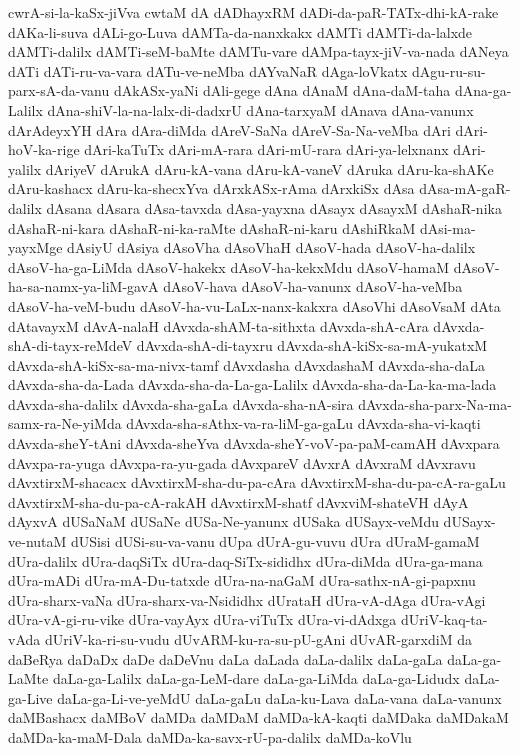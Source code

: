 {cwrA-si-la-kaSx-jiVva
cwtaM
dA
dADhayxRM
dADi-da-paR-TATx-dhi-kA-rake
dAKa-li-suva
dALi-go-Luva
dAMTa-da-nanxkakx
dAMTi
dAMTi-da-lalxde
dAMTi-dalilx
dAMTi-seM-baMte
dAMTu-vare
dAMpa-tayx-jiV-va-nada
dANeya
dATi
dATi-ru-va-vara
dATu-ve-neMba
dAYvaNaR
dAga-loVkatx
dAgu-ru-su-parx-sA-da-vanu
dAkASx-yaNi
dAli-gege
dAna
dAnaM
dAna-daM-taha
dAna-ga-Lalilx
dAna-shiV-la-na-lalx-di-dadxrU
dAna-tarxyaM
dAnava
dAna-vanunx
dArAdeyxYH
dAra
dAra-diMda
dAreV-SaNa
dAreV-Sa-Na-veMba
dAri
dAri-hoV-ka-rige
dAri-kaTuTx
dAri-mA-rara
dAri-mU-rara
dAri-ya-lelxnanx
dAri-yalilx
dAriyeV
dArukA
dAru-kA-vana
dAru-kA-vaneV
dAruka
dAru-ka-shAKe
dAru-kashacx
dAru-ka-shecxYva
dArxkASx-rAma
dArxkiSx
dAsa
dAsa-mA-gaR-dalilx
dAsana
dAsara
dAsa-tavxda
dAsa-yayxna
dAsayx
dAsayxM
dAshaR-nika
dAshaR-ni-kara
dAshaR-ni-ka-raMte
dAshaR-ni-karu
dAshiRkaM
dAsi-ma-yayxMge
dAsiyU
dAsiya
dAsoVha
dAsoVhaH
dAsoV-hada
dAsoV-ha-dalilx
dAsoV-ha-ga-LiMda
dAsoV-hakekx
dAsoV-ha-kekxMdu
dAsoV-hamaM
dAsoV-ha-sa-namx-ya-liM-gavA
dAsoV-hava
dAsoV-ha-vanunx
dAsoV-ha-veMba
dAsoV-ha-veM-budu
dAsoV-ha-vu-LaLx-nanx-kakxra
dAsoVhi
dAsoVsaM
dAta
dAtavayxM
dAvA-nalaH
dAvxda-shAM-ta-sithxta
dAvxda-shA-cAra
dAvxda-shA-di-tayx-reMdeV
dAvxda-shA-di-tayxru
dAvxda-shA-kiSx-sa-mA-yukatxM
dAvxda-shA-kiSx-sa-ma-nivx-tamf
dAvxdasha
dAvxdashaM
dAvxda-sha-daLa
dAvxda-sha-da-Lada
dAvxda-sha-da-La-ga-Lalilx
dAvxda-sha-da-La-ka-ma-lada
dAvxda-sha-dalilx
dAvxda-sha-gaLa
dAvxda-sha-nA-sira
dAvxda-sha-parx-Na-ma-samx-ra-Ne-yiMda
dAvxda-sha-sAthx-va-ra-liM-ga-gaLu
dAvxda-sha-vi-kaqti
dAvxda-sheY-tAni
dAvxda-sheYva
dAvxda-sheY-voV-pa-paM-camAH
dAvxpara
dAvxpa-ra-yuga
dAvxpa-ra-yu-gada
dAvxpareV
dAvxrA
dAvxraM
dAvxravu
dAvxtirxM-shacacx
dAvxtirxM-sha-du-pa-cAra
dAvxtirxM-sha-du-pa-cA-ra-gaLu
dAvxtirxM-sha-du-pa-cA-rakAH
dAvxtirxM-shatf
dAvxviM-shateVH
dAyA
dAyxvA
dUSaNaM
dUSaNe
dUSa-Ne-yanunx
dUSaka
dUSayx-veMdu
dUSayx-ve-nutaM
dUSisi
dUSi-su-va-vanu
dUpa
dUrA-gu-vuvu
dUra
dUraM-gamaM
dUra-dalilx
dUra-daqSiTx
dUra-daq-SiTx-sididhx
dUra-diMda
dUra-ga-mana
dUra-mADi
dUra-mA-Du-tatxde
dUra-na-naGaM
dUra-sathx-nA-gi-papxnu
dUra-sharx-vaNa
dUra-sharx-va-Nsididhx
dUrataH
dUra-vA-dAga
dUra-vAgi
dUra-vA-gi-ru-vike
dUra-vayAyx
dUra-viTuTx
dUra-vi-dAdxga
dUriV-kaq-ta-vAda
dUriV-ka-ri-su-vudu
dUvARM-ku-ra-su-pU-gAni
dUvAR-garxdiM
da
daBeRya
daDaDx
daDe
daDeVnu
daLa
daLada
daLa-dalilx
daLa-gaLa
daLa-ga-LaMte
daLa-ga-Lalilx
daLa-ga-LeM-dare
daLa-ga-LiMda
daLa-ga-Lidudx
daLa-ga-Live
daLa-ga-Li-ve-yeMdU
daLa-gaLu
daLa-ku-Lava
daLa-vana
daLa-vanunx
daMBashacx
daMBoV
daMDa
daMDaM
daMDa-kA-kaqti
daMDaka
daMDakaM
daMDa-ka-maM-Dala
daMDa-ka-savx-rU-pa-dalilx
daMDa-koVlu
}
